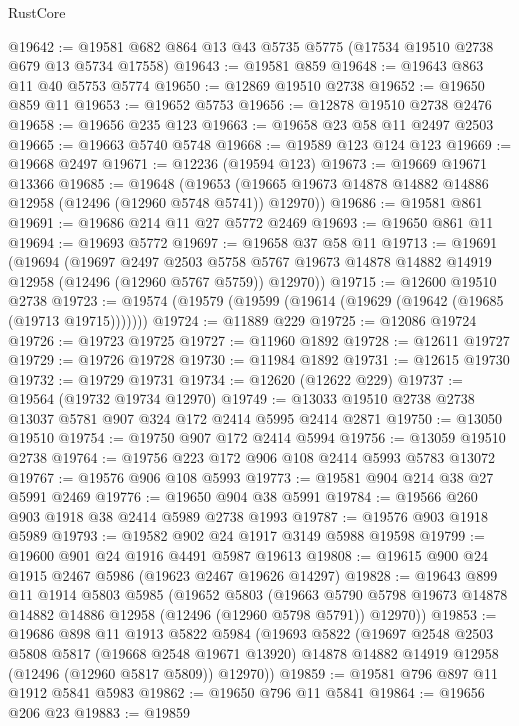 \begin{lexlean}{RustCore}
\begin{coremodule}
@19642 := @19581 @682 @864 @13 @43 @5735 @5775 (@17534 @19510 @2738 @679 @13 @5734 @17558)
@19643 := @19581 @859
@19648 := @19643 @863 @11 @40 @5753 @5774
@19650 := @12869 @19510 @2738
@19652 := @19650 @859 @11
@19653 := @19652 @5753
@19656 := @12878 @19510 @2738 @2476
@19658 := @19656 @235 @123
@19663 := @19658 @23 @58 @11 @2497 @2503
@19665 := @19663 @5740 @5748
@19668 := @19589 @123 @124 @123
@19669 := @19668 @2497
@19671 := @12236 (@19594 @123)
@19673 := @19669 @19671 @13366
@19685 := @19648
    (@19653 (@19665 @19673 @14878 @14882 @14886 @12958 (@12496 (@12960 @5748 @5741)) @12970))
@19686 := @19581 @861
@19691 := @19686 @214 @11 @27 @5772 @2469
@19693 := @19650 @861 @11
@19694 := @19693 @5772
@19697 := @19658 @37 @58 @11
@19713 := @19691
    (@19694
      (@19697
        @2497
        @2503
        @5758
        @5767
        @19673
        @14878
        @14882
        @14919
        @12958
        (@12496 (@12960 @5767 @5759))
        @12970))
@19715 := @12600 @19510 @2738
@19723 := @19574 (@19579 (@19599 (@19614 (@19629 (@19642 (@19685 (@19713 @19715)))))))
@19724 := @11889 @229
@19725 := @12086 @19724
@19726 := @19723 @19725
@19727 := @11960 @1892
@19728 := @12611 @19727
@19729 := @19726 @19728
@19730 := @11984 @1892
@19731 := @12615 @19730
@19732 := @19729 @19731
@19734 := @12620 (@12622 @229)
@19737 := @19564 (@19732 @19734 @12970)
@19749 := @13033 @19510 @2738 @2738 @13037 @5781 @907 @324 @172 @2414 @5995 @2414 @2871
@19750 := @13050 @19510
@19754 := @19750 @907 @172 @2414 @5994
@19756 := @13059 @19510 @2738
@19764 := @19756 @223 @172 @906 @108 @2414 @5993 @5783 @13072
@19767 := @19576 @906 @108 @5993
@19773 := @19581 @904 @214 @38 @27 @5991 @2469
@19776 := @19650 @904 @38 @5991
@19784 := @19566 @260 @903 @1918 @38 @2414 @5989 @2738 @1993
@19787 := @19576 @903 @1918 @5989
@19793 := @19582 @902 @24 @1917 @3149 @5988 @19598
@19799 := @19600 @901 @24 @1916 @4491 @5987 @19613
@19808 := @19615 @900 @24 @1915 @2467 @5986 (@19623 @2467 @19626 @14297)
@19828 := @19643
    @899
    @11
    @1914
    @5803
    @5985
    (@19652
      @5803
      (@19663 @5790 @5798 @19673 @14878 @14882 @14886 @12958 (@12496 (@12960 @5798 @5791)) @12970))
@19853 := @19686
    @898
    @11
    @1913
    @5822
    @5984
    (@19693
      @5822
      (@19697
        @2548
        @2503
        @5808
        @5817
        (@19668 @2548 @19671 @13920)
        @14878
        @14882
        @14919
        @12958
        (@12496 (@12960 @5817 @5809))
        @12970))
@19859 := @19581 @796 @897 @11 @1912 @5841 @5983
@19862 := @19650 @796 @11 @5841
@19864 := @19656 @206 @23
@19883 := @19859

\end{coremodule}
\end{lexlean}
